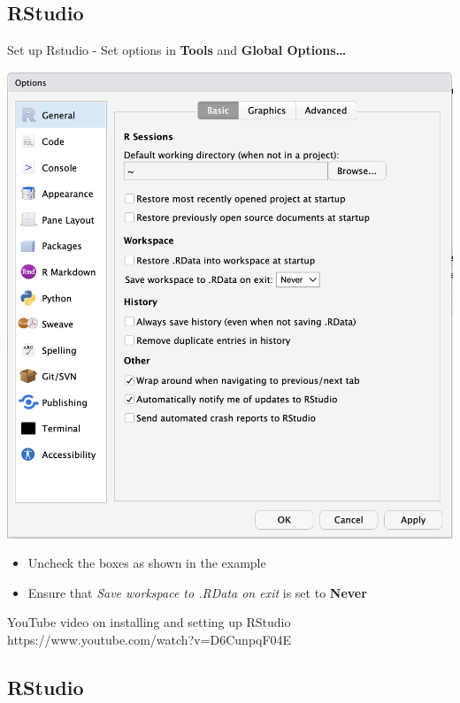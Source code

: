 \documentclass[
  letterpaper,
  DIV=11,
  numbers=noendperiod,
  landscape]{scrartcl}
\providecommand{\tightlist}{%
  \setlength{\itemsep}{0pt}\setlength{\parskip}{0pt}}\usepackage{longtable,booktabs,array}
\begin{document}
\hypertarget{section}{%
\subsection{}\label{section}}

\hypertarget{rstudio-2}{%
\subsection{RStudio}\label{rstudio-2}}

Set up Rstudio - Set options in \textbf{Tools} and \textbf{Global
Options\ldots{}}

\includegraphics[width=1\textwidth,height=\textheight]{images/RStudio_settings.png}

\begin{itemize}
\tightlist
\item
  Uncheck the boxes as shown in the example
\item
  Ensure that \emph{Save workspace to .RData on exit} is set to
  \textbf{Never}
\end{itemize}

{YouTube video on installing and setting up RStudio
https://www.youtube.com/watch?v=D6CunpqF04E}

\hypertarget{rstudio-3}{%
\subsection{RStudio}\label{rstudio-3}}
\end{document}
